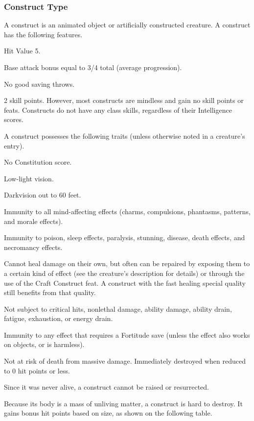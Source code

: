 {\subsubsection{Construct Type} A construct is an animated object or artificially constructed creature.
 A construct has the following features.
\begin{itemize*}
\item Hit Value 5.
\item Base attack bonus equal to 3/4 total  (average progression).
\item No good saving throws.
\item 2 skill points. However, most constructs are mindless and gain no skill points or feats. Constructs do not have any class skills, regardless of their Intelligence scores.
\end{itemize*}
 A construct possesses the following traits (unless otherwise noted in a creature's entry).
\begin{itemize*}
\item No Constitution score.
\item Low-light vision.
\item Darkvision out to 60 feet.
\item Immunity to all mind-affecting effects (charms, compulsions, phantasms, patterns, and morale effects).
\item Immunity to poison, sleep effects, paralysis, stunning, disease, death effects, and necromancy effects.
\item Cannot heal damage on their own, but often can be repaired by exposing them to a certain kind of effect (see the creature's description for details) or through the use of the Craft Construct feat. A construct with the fast healing special quality still benefits from that quality.
\item Not subject to critical hits, nonlethal damage, ability damage, ability drain, fatigue, exhaustion, or energy drain.
\item Immunity to any effect that requires a Fortitude save (unless the effect also works on objects, or is harmless).
\item Not at risk of death from massive damage. Immediately destroyed when reduced to 0 hit points or less.
\item Since it was never alive, a construct cannot be raised or resurrected.
\item Because its body is a mass of unliving matter, a construct is hard to destroy. It gains bonus hit points based on size, as shown on the following table.

\end{itemize*}}
